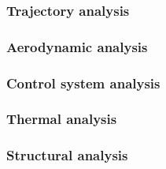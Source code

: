 
\subsubsection{Trajectory analysis}\label{subsec:orbittool}


\subsubsection{Aerodynamic analysis}\label{subsec:aerotool}


\subsubsection{Control system analysis}\label{subsec:controltool}


\subsubsection{Thermal analysis}\label{subsec:thermaltool}


\subsubsection{Structural analysis}\label{subsec:structool}






